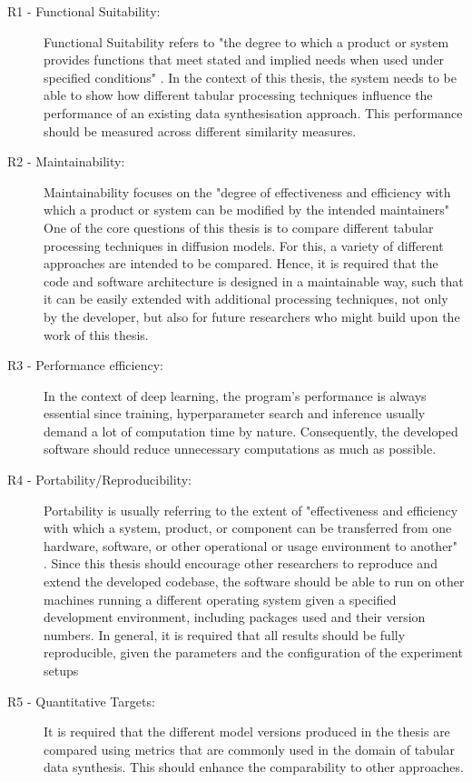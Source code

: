 \begin{description}
	\item[R1 - Functional Suitability:]
		Functional Suitability refers to "the degree to which a product or system provides functions that meet stated and implied needs when used under specified conditions" \cite[p. 219]{bass2013SoftwareArchitecturePractice}.
		In the context of this thesis, the system needs to be able to show how different tabular processing techniques influence the performance of an existing data synthesisation approach.
		This performance should be measured across different similarity measures.

	\item[R2 - Maintainability:]
		Maintainability focuses on the "degree of effectiveness and efficiency with which a product or system can be modified by the intended maintainers" \cite[p. 220]{bass2013SoftwareArchitecturePractice}
		One of the core questions of this thesis is to compare different tabular processing techniques in diffusion models.
		For this, a variety of different approaches are intended to be compared.
		Hence, it is required that the code and software architecture is designed in a maintainable way, such that it can be easily extended with additional processing techniques, not only by the developer,
		but also for future researchers who might build upon the work of this thesis.

	\item[R3 - Performance efficiency:]
		In the context of deep learning, the program's performance is always essential since training, hyperparameter search and inference usually demand a lot of computation time by nature.
		Consequently, the developed software should reduce unnecessary computations as much as possible.

	\item[R4 - Portability/Reproducibility:]
		Portability is usually referring to the extent of "effectiveness and efficiency with which a system, product, or component can be transferred from one hardware, software,
		or other operational or usage environment to another" \cite[p. 220]{bass2013SoftwareArchitecturePractice}.
		Since this thesis should encourage other researchers to reproduce and extend the developed codebase, the software should be able to run on other machines running a different operating system given a specified development environment,
		including packages used and their version numbers.
		In general, it is required that all results should be fully reproducible, given the parameters and the configuration of the experiment setups

	\item[R5 - Quantitative Targets:]
		It is required that the different model versions produced in the thesis are compared using metrics that are commonly used in the domain of tabular data synthesis.
		This should enhance the comparability to other approaches.
\end{description}


